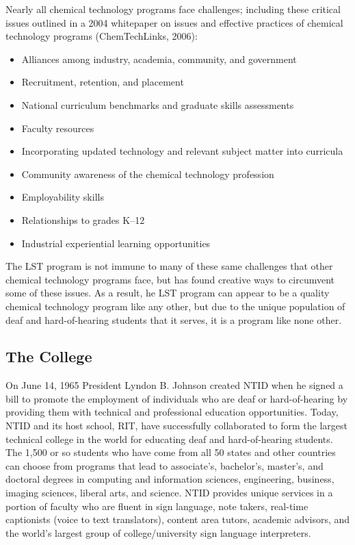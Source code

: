 \documentclass[11.5pt]{sig-alternate} %
\begin{document}
\begin{large}
Nearly all chemical technology programs face challenges; including these critical issues outlined in a 2004 whitepaper on issues and effective practices of chemical technology programs (ChemTechLinks, 2006):
\begin{itemize}
    \item Alliances among industry, academia, community, and government
    \item Recruitment, retention, and placement
    \item National curriculum benchmarks and graduate skills assessments
    \item Faculty resources
    \item Incorporating updated technology and relevant subject matter into curricula
    \item Community awareness of the chemical technology profession
    \item Employability skills
    \item Relationships to grades K–12
    \item Industrial experiential learning opportunities
\end{itemize}

The LST program is not immune to many of these same challenges that other chemical technology programs face, but has found creative ways to circumvent some of these issues. As a result, he LST program can appear to be a quality chemical technology program like any other, but due to the unique population of deaf and hard-of-hearing students that it serves, it is a program like none other.

\subsection*{The College}
On June 14, 1965 President Lyndon B. Johnson created NTID when he signed a bill to promote the employment of individuals who are deaf or hard-of-hearing by providing them with technical and professional education opportunities. Today, NTID and its host school, RIT, have successfully collaborated to form the largest technical college in the world for educating deaf and hard-of-hearing students. The 1,500 or so students who have come from all 50 states and other countries can choose from programs that lead to associate’s, bachelor’s, master’s, and doctoral degrees in computing and information sciences, engineering, business, imaging sciences, liberal arts, and science. NTID provides unique services in a portion of faculty who are fluent in sign language, note takers, real-time captionists (voice to text translators), content area tutors, academic advisors, and the world’s largest group of college/university sign language interpreters.


\end{large}
\end{document}
